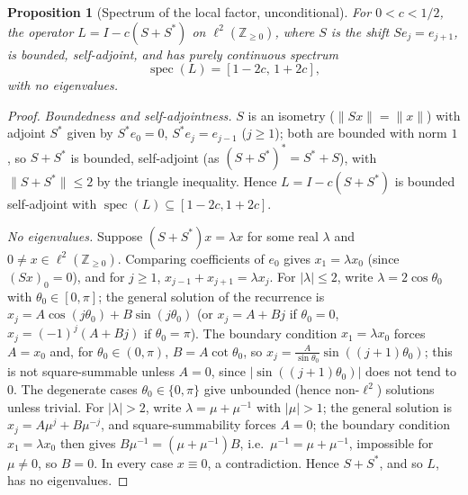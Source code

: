 \documentclass[11pt]{amsart}
\numberwithin{equation}{section}
\theoremstyle{plain}
\newtheorem{proposition}[theorem]{Proposition}
\theoremstyle{definition}
\theoremstyle{remark}
\begin{document}
\begin{proposition}[Spectrum of the local factor, unconditional]
\label{prop:Lp_spectrum}
For \(0<c<1/2\), the operator \(L=I-c(S+S^*)\) on \(\ell^2(\mathbb Z_{\ge0})\), where \(S\) is the shift \(Se_j=e_{j+1}\), is bounded, self-adjoint, and has purely continuous spectrum
\begin{equation}
\operatorname{spec}(L)=[1-2c,\,1+2c],
\label{eq:Lp_spectrum}
\end{equation}
with no eigenvalues.
\end{proposition}

\begin{proof}
\emph{Boundedness and self-adjointness.} \(S\) is an isometry (\(\|Sx\|=\|x\|\)) with adjoint \(S^*\) given by \(S^*e_0=0\), \(S^*e_j=e_{j-1}\) (\(j\ge1\)); both are bounded with norm \(1\), so \(S+S^*\) is bounded, self-adjoint (as \((S+S^*)^*=S^*+S\)), with \(\|S+S^*\|\le2\) by the triangle inequality. Hence \(L=I-c(S+S^*)\) is bounded self-adjoint with \(\operatorname{spec}(L)\subseteq[1-2c,1+2c]\).

\emph{No eigenvalues.} Suppose \((S+S^*)x=\lambda x\) for some real \(\lambda\) and \(0\ne x\in\ell^2(\mathbb Z_{\ge0})\). Comparing coefficients of \(e_0\) gives \(x_1=\lambda x_0\) (since \((Sx)_0=0\)), and for \(j\ge1\), \(x_{j-1}+x_{j+1}=\lambda x_j\). For \(|\lambda|\le2\), write \(\lambda=2\cos\theta_0\) with \(\theta_0\in[0,\pi]\); the general solution of the recurrence is \(x_j=A\cos(j\theta_0)+B\sin(j\theta_0)\) (or \(x_j=A+Bj\) if \(\theta_0=0\), \(x_j=(-1)^j(A+Bj)\) if \(\theta_0=\pi\)). The boundary condition \(x_1=\lambda x_0\) forces \(A=x_0\) and, for \(\theta_0\in(0,\pi)\), \(B=A\cot\theta_0\), so \(x_j=\frac{A}{\sin\theta_0}\sin((j+1)\theta_0)\); this is not square-summable unless \(A=0\), since \(|\sin((j+1)\theta_0)|\) does not tend to \(0\). The degenerate cases \(\theta_0\in\{0,\pi\}\) give unbounded (hence non-\(\ell^2\)) solutions unless trivial. For \(|\lambda|>2\), write \(\lambda=\mu+\mu^{-1}\) with \(|\mu|>1\); the general solution is \(x_j=A\mu^j+B\mu^{-j}\), and square-summability forces \(A=0\); the boundary condition \(x_1=\lambda x_0\) then gives \(B\mu^{-1}=(\mu+\mu^{-1})B\), i.e.\ \(\mu^{-1}=\mu+\mu^{-1}\), impossible for \(\mu\ne0\), so \(B=0\). In every case \(x\equiv0\), a contradiction. Hence \(S+S^*\), and so \(L\), has no eigenvalues.


\end{proof}
\end{document}
